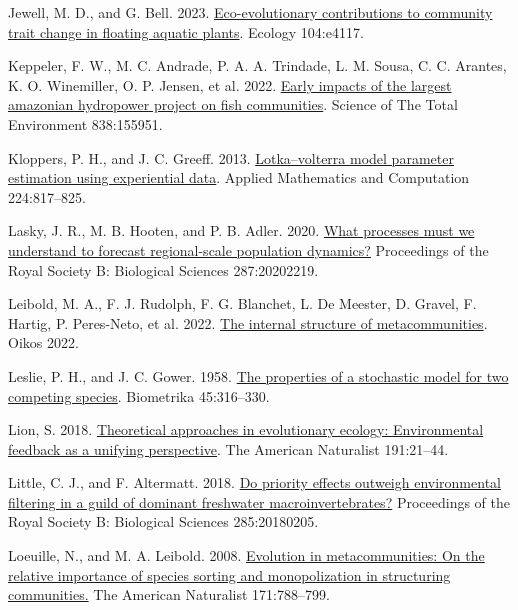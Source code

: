 \documentclass[
]{article}
\newlength{\cslhangindent}
\newlength{\cslentryspacingunit} %
\newenvironment{CSLReferences}[2] %
 {%
  \setlength{\parindent}{0pt}
  \ifodd #1
  \let\oldpar\par
  \def\par{\hangindent=\cslhangindent\oldpar}
  \fi
  \setlength{\parskip}{#2\cslentryspacingunit}
 }%
 {}
\begin{document}
\begin{CSLReferences}{0}{0}
\leavevmode{}%
Jewell, M. D., and G. Bell. 2023. \href{https://doi.org/10.1002/ecy.4117}{Eco-evolutionary contributions to community trait change in floating aquatic plants}. Ecology 104:e4117.

\leavevmode{}%
Keppeler, F. W., M. C. Andrade, P. A. A. Trindade, L. M. Sousa, C. C. Arantes, K. O. Winemiller, O. P. Jensen, et al. 2022. \href{https://doi.org/10.1016/j.scitotenv.2022.155951}{Early impacts of the largest amazonian hydropower project on fish communities}. Science of The Total Environment 838:155951.

\leavevmode{}%
Kloppers, P. H., and J. C. Greeff. 2013. \href{https://doi.org/10.1016/j.amc.2013.08.093}{Lotka--volterra model parameter estimation using experiential data}. Applied Mathematics and Computation 224:817--825.

\leavevmode{}%
Lasky, J. R., M. B. Hooten, and P. B. Adler. 2020. \href{https://doi.org/10.1098/rspb.2020.2219}{What processes must we understand to forecast regional-scale population dynamics?} Proceedings of the Royal Society B: Biological Sciences 287:20202219.

\leavevmode{}%
Leibold, M. A., F. J. Rudolph, F. G. Blanchet, L. De Meester, D. Gravel, F. Hartig, P. Peres-Neto, et al. 2022. \href{https://doi.org/10.1111/oik.08618}{The internal structure of metacommunities}. Oikos 2022.

\leavevmode{}%
Leslie, P. H., and J. C. Gower. 1958. \href{http://www.jstor.org/stable/2333181}{The properties of a stochastic model for two competing species}. Biometrika 45:316--330.

\leavevmode{}%
Lion, S. 2018. \href{https://doi.org/10.1086/694865}{Theoretical approaches in evolutionary ecology: Environmental feedback as a unifying perspective}. The American Naturalist 191:21--44.

\leavevmode{}%
Little, C. J., and F. Altermatt. 2018. \href{https://doi.org/10.1098/rspb.2018.0205}{Do priority effects outweigh environmental filtering in a guild of dominant freshwater macroinvertebrates?} Proceedings of the Royal Society B: Biological Sciences 285:20180205.

\leavevmode{}%
Loeuille, N., and M. A. Leibold. 2008. \href{https://doi.org/10.1086/587745}{Evolution in metacommunities: On the relative importance of species sorting and monopolization in structuring communities.} The American Naturalist 171:788--799.


\end{CSLReferences}
\end{document}
